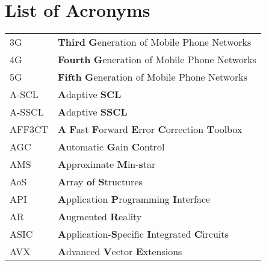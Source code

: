
\chapter*{List of Acronyms}

\begin{center}
\begin{longtable}{ p{}  p{} }
3G          & \textbf{Third} \textbf{G}eneration of Mobile Phone Networks                                                     \\
4G          & \textbf{Fourth} \textbf{G}eneration of Mobile Phone Networks                                                    \\
5G          & \textbf{Fifth} \textbf{G}eneration of Mobile Phone Networks                                                     \\
A-SCL       & \textbf{A}daptive \textbf{SCL}                                                                                  \\
A-SSCL      & \textbf{A}daptive \textbf{SSCL}                                                                                 \\
AFF3CT      & \textbf{A} \textbf{F}ast \textbf{F}orward \textbf{E}rror \textbf{C}orrection \textbf{T}oolbox                   \\
AGC         & \textbf{A}utomatic \textbf{G}ain \textbf{C}ontrol                                                               \\
AMS         & \textbf{A}pproximate \textbf{M}in-\textbf{s}tar                                                                 \\
AoS         & \textbf{A}rray \textbf{o}f \textbf{S}tructures                                                                  \\
API         & \textbf{A}pplication \textbf{P}rogramming \textbf{I}nterface                                                    \\
AR          & \textbf{A}ugmented \textbf{R}eality                                                                             \\
ASIC        & \textbf{A}pplication-\textbf{S}pecific \textbf{I}ntegrated \textbf{C}ircuits                                    \\
AVX         & \textbf{A}dvanced \textbf{V}ector \textbf{E}xtensions                                                           \\

\end{longtable}
\end{center}
